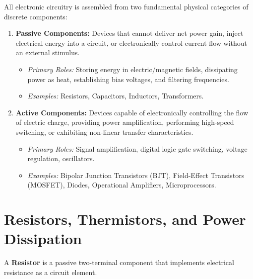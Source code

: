 All electronic circuitry is assembled from two fundamental physical categories of discrete components:

\begin{enumerate}[label=\bfseries\arabic*.]
    \item \textbf{Passive Components:} Devices that cannot deliver net power gain, inject electrical energy into a circuit, or electronically control current flow without an external stimulus.
    \begin{itemize}
        \item \textit{Primary Roles:} Storing energy in electric/magnetic fields, dissipating power as heat, establishing bias voltages, and filtering frequencies.
        \item \textit{Examples:} Resistors, Capacitors, Inductors, Transformers.
    \end{itemize}
    \item \textbf{Active Components:} Devices capable of electronically controlling the flow of electric charge, providing power amplification, performing high-speed switching, or exhibiting non-linear transfer characteristics.
    \begin{itemize}
        \item \textit{Primary Roles:} Signal amplification, digital logic gate switching, voltage regulation, oscillators.
        \item \textit{Examples:} Bipolar Junction Transistors (BJT), Field-Effect Transistors (MOSFET), Diodes, Operational Amplifiers, Microprocessors.
    \end{itemize}
\end{enumerate}


\section{Resistors, Thermistors, and Power Dissipation}
\label{sec:resistors}

A \textbf{Resistor} is a passive two-terminal component that implements electrical resistance as a circuit element.

